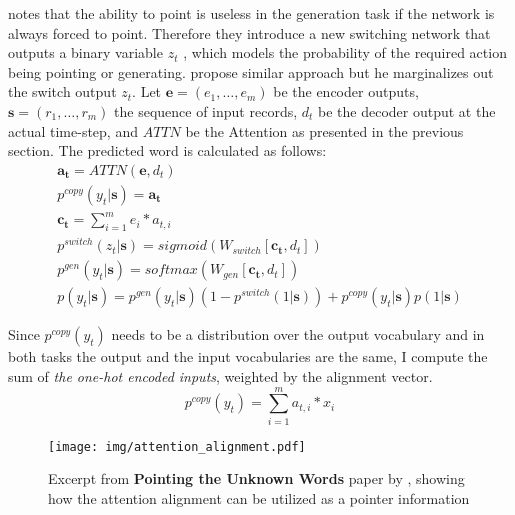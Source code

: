 \citep{gulcehre2016pointing} notes that the ability to point is useless in the generation task if the network is always forced to point. Therefore they introduce a new switching network that outputs a binary variable $z_t$ , which models the probability of the required action being pointing or generating. \citep{yang2016referenceaware} propose similar approach but he marginalizes out the switch output $z_t$. Let $\mathbf{e} = (e_1, \dots, e_m)$ be the encoder outputs, $\mathbf{s} = (r_1, \dots, r_m)$ the sequence of input records, $d_t$ be the decoder output at the actual time-step, and $ATTN$ be the Attention as presented in the previous section. The predicted word is calculated as follows:
\begin{gather}
    \mathbf{a_t} = ATTN(\mathbf{e}, d_t) \\
    p^{copy}(y_t | \mathbf{s}) = \mathbf{a_t} \\
    \mathbf{c_t} = \sum_{i=1}^m{e_i * a_{t, i}} \\
    p^{switch}(z_t | \mathbf{s}) = sigmoid(W_{switch}[\mathbf{c_t}, d_t]) \\
    p^{gen}(y_t | \mathbf{s}) = softmax(W_{gen}[\mathbf{c_t}, d_t]) \\
    p(y_t | \mathbf{s}) = p^{gen}(y_t | \mathbf{s})(1 - p^{switch}(1 | \mathbf{s})) + p^{copy}(y_t | \mathbf{s})p(1 | \mathbf{s})
\end{gather}

Since $p^{copy}(y_t)$ needs to be a distribution over the output vocabulary and in both tasks the output and the input vocabularies are the same, I compute the sum of \emph{the one-hot encoded inputs}, weighted by the alignment vector.
\begin{equation}
    p^{copy}(y_t) = \sum_{i=1}^m{a_{t,i} * x_i}
\end{equation}

\begin{figure}[hb]
    \centering
    \texttt{[image: img/attention\_alignment.pdf]}
    \caption{Excerpt from \textbf{Pointing the Unknown Words} paper by \citep{gulcehre2016pointing}, showing how the attention alignment can be utilized as a pointer information}
\end{figure}